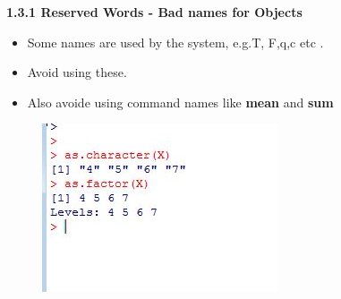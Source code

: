 \documentclass{beamer}
\begin{document}
 \begin{frame}
 	
 	\textbf{1.3.1 Reserved Words - Bad names for Objects}
 	\begin{itemize}
 		\item Some names are used by the system, e.g.T, F,q,c etc . 
 		\item Avoid using these.
 		\item Also avoide using command names like \textbf{mean} and \textbf{sum}
 	\end{itemize}
 \end{frame}
 \begin{frame}
 	\begin{figure}
 		\centering
 		\includegraphics[width=0.7\linewidth]{images/typeconversion} 
 	\end{figure}
 \end{frame}   
 
 
 
\end{document}
